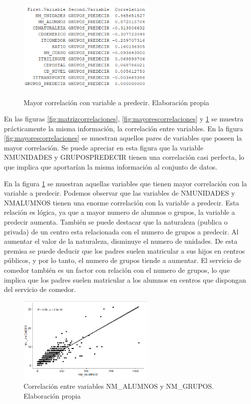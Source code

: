 \begin{subappendices}
\begin{figure}[htb]
	\centering
	\caption{Mayor correlación con variable a predecir. Elaboración propia}
	\includegraphics[width=0.6\textwidth]{recursos/ImagenesR/mayorcorrelacion}
	\label{fig:mayorcorrelacionpredecir}
\end{figure}
\FloatBarrier
En las figuras \ref{fig:matrizcorrelaciones}, \ref{fig:mayorescorrelaciones} y \ref{fig:mayorcorrelacionpredecir} se muestra prácticamente la misma información, la correlación entre variables. En la figura \ref{fig:mayorescorrelaciones} se muestran aquellos pares de variables que poseen la mayor correlación. Se puede apreciar en esta figura que la variable NMUNIDADES y GRUPOSPREDECIR tienen una correlación casi perfecta, lo que implica que aportarían la misma información al conjunto de datos.

En la figura \ref{fig:mayorcorrelacionpredecir} se muestran aquellas variables que tienen mayor correlación con la variable a predecir. Podemos observar que las variables de NMUNIDADES y NMALUMNOS tienen una enorme correlación con la variable a predecir. Esta relación es lógica, ya que a mayor numero de alumnos o grupos, la variable a predecir aumenta. También se puede destacar que la naturaleza (publica o privada) de un centro esta relacionada con el numero de grupos a predecir. Al aumentar el valor de la naturaleza, disminuye el numero de unidades. De esta premisa se puede deducir que los padres suelen matricular a sus hijos en centros públicos, y por lo tanto, el numero de grupos tiende a aumentar. El servicio de comedor también es un factor con relación con el numero de grupos, lo que implica que los padres suelen matricular a los alumnos en centros que dispongan del servicio de comedor.

\begin{figure}[htb]
	\centering
	\caption{Correlación entre variables NM\_ALUMNOS y NM\_GRUPOS. Elaboración propia}
	\label{fig:relacionAlumnGrup}
	\includegraphics[width=0.6\textwidth]{recursos/ImagenesR/RelacionAlumnGrupos}
	

\end{figure}
\end{subappendices}
